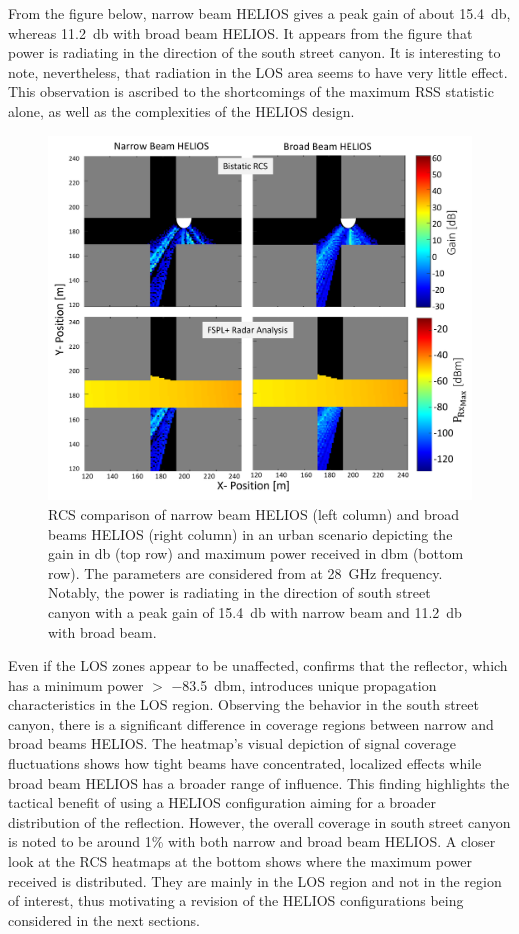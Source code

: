 From the figure below, narrow beam HELIOS gives a peak gain of about \SI{15.4}{\decibel}, whereas \SI{11.2}{\decibel} with broad beam HELIOS. It appears from the figure that power is radiating in the direction of the south street canyon. It is interesting to note, nevertheless, that radiation in the LOS area seems to have very little effect. This observation is ascribed to the shortcomings of the maximum \ac{RSS} statistic alone, as well as the complexities of the HELIOS design.
\begin{figure}[H]
	\centering
	\includegraphics[width=0.8\linewidth]{images/Section 4 Images/urbanscenario_originalvalues}
	\caption{RCS comparison of narrow beam HELIOS (left column) and broad beams HELIOS (right column) in an urban scenario depicting the gain in \si{\decibel} (top row) and maximum power received in \si{\decibel}m (bottom row). The parameters are considered from  at \SI{28}{\giga\hertz} frequency. Notably, the power is radiating in the direction of south street canyon with a peak gain of \SI{15.4}{\decibel} with narrow beam and \SI{11.2}{\decibel} with broad beam. }
	\label{fig:urbanscenario_originalvalues}
\end{figure}
Even if the LOS zones appear to be unaffected,  confirms that the reflector, which has a minimum power $>$ \SI{-83.5}{\decibel}m, introduces unique propagation characteristics in the LOS region. Observing the behavior in the south street canyon, there is a significant difference in coverage regions between narrow and broad beams HELIOS. The heatmap's visual depiction of signal coverage fluctuations shows how tight beams have concentrated, localized effects while broad beam HELIOS has a broader range of influence. This finding highlights the tactical benefit of using a HELIOS configuration aiming for a broader distribution of the reflection. However, the overall coverage in south street canyon is noted to be around \num{1}\% with both narrow and broad beam HELIOS. A closer look at the RCS heatmaps at the bottom shows where the maximum power received is distributed. They are mainly in the LOS region and not in the region of interest, thus motivating a revision of the HELIOS configurations being considered in the next sections. 
